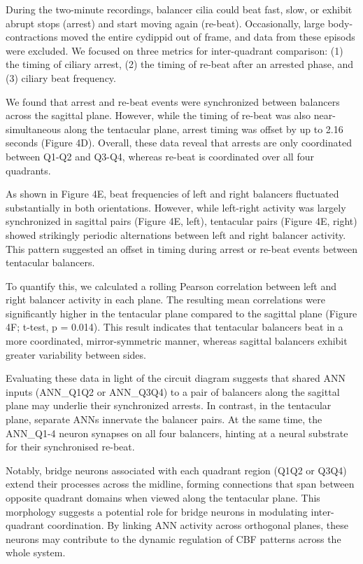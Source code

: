 \documentclass[
  11pt,
]{article}
\begin{document}
During the two-minute recordings, balancer cilia could beat fast, slow,
or exhibit abrupt stops (arrest) and start moving again (re-beat).
Occasionally, large body-contractions moved the entire cydippid out of
frame, and data from these episods were excluded. We focused on three
metrics for inter-quadrant comparison: (1) the timing of ciliary arrest,
(2) the timing of re-beat after an arrested phase, and (3) ciliary beat
frequency.

We found that arrest and re-beat events were synchronized between
balancers across the sagittal plane. However, while the timing of
re-beat was also near-simultaneous along the tentacular plane, arrest
timing was offset by up to 2.16 seconds (Figure 4D). Overall, these data
reveal that arrests are only coordinated between Q1-Q2 and Q3-Q4,
whereas re-beat is coordinated over all four quadrants.

As shown in Figure 4E, beat frequencies of left and right balancers
fluctuated substantially in both orientations. However, while left-right
activity was largely synchronized in sagittal pairs (Figure 4E, left),
tentacular pairs (Figure 4E, right) showed strikingly periodic
alternations between left and right balancer activity. This pattern
suggested an offset in timing during arrest or re-beat events between
tentacular balancers.

To quantify this, we calculated a rolling Pearson correlation between
left and right balancer activity in each plane. The resulting mean
correlations were significantly higher in the tentacular plane compared
to the sagittal plane (Figure 4F; t-test, p = 0.014). This result
indicates that tentacular balancers beat in a more coordinated,
mirror-symmetric manner, whereas sagittal balancers exhibit greater
variability between sides.

Evaluating these data in light of the circuit diagram suggests that
shared ANN inputs (ANN\_Q1Q2 or ANN\_Q3Q4) to a pair of balancers along
the sagittal plane may underlie their synchronized arrests. In contrast,
in the tentacular plane, separate ANNs innervate the balancer pairs. At
the same time, the ANN\_Q1-4 neuron synapses on all four balancers,
hinting at a neural substrate for their synchronised re-beat.

Notably, bridge neurons associated with each quadrant region (Q1Q2 or
Q3Q4) extend their processes across the midline, forming connections
that span between opposite quadrant domains when viewed along the
tentacular plane. This morphology suggests a potential role for bridge
neurons in modulating inter-quadrant coordination. By linking ANN
activity across orthogonal planes, these neurons may contribute to the
dynamic regulation of CBF patterns across the whole system.
\end{document}
